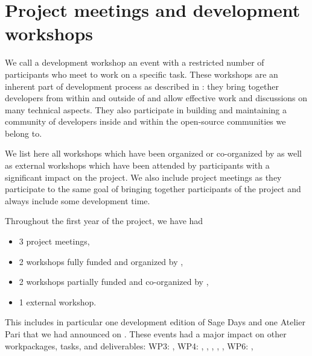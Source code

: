 \documentclass{deliverablereport}
\author{Viviane Pons et al.}
\begin{document}
\enlargethispage{4ex}
\maketitle
\githubissuedescription
\newpage
\tableofcontents
\newpage


\section{Project meetings and development workshops}

We call a development workshop an event with a restricted number of participants
who meet to work on a specific task. These workshops are an inherent part
of \ODK development process as described in :
 they bring together
developers from within and outside of \ODK and allow effective work
and discussions on many technical aspects. They also participate in building
and maintaining a community of developers inside \ODK and within the
open-source communities we belong to.

We list here all workshops which have been organized or co-organized by \ODK
as well as external workshops which have been attended by \ODK participants
with a significant impact on the project. We also include project meetings as they
participate to the same goal of bringing together participants of the project and
always include some development time.

Throughout the first year of the project, we have had
\begin{itemize}
\item 3 project meetings,
\item 2 workshops fully funded and organized by \ODK,
\item 2 workshops partially funded and co-organized by \ODK,
\item 1 external workshop.
\end{itemize}
This includes in particular one development edition of Sage Days and one Atelier
Pari that we had announced on .
 These events had a major impact on other \ODK workpackages, tasks, and deliverables: WP3:
,
WP4:
,
,
,
,
,
WP6:
,
\end{document}
